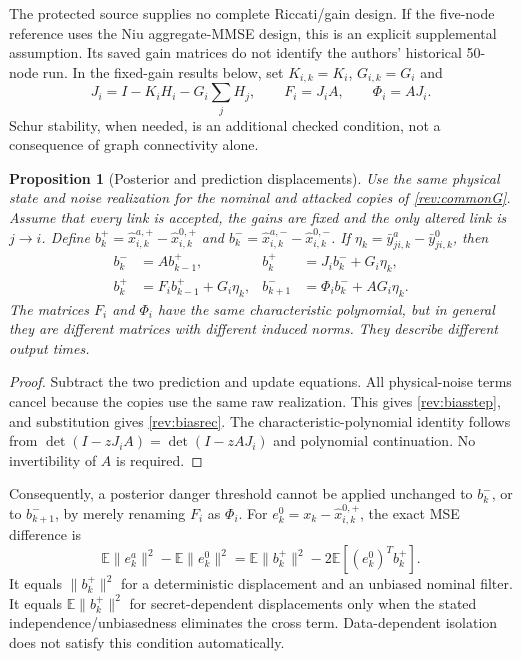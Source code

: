 \documentclass[11pt,a4paper]{article}
\newtheorem{proposition}{Proposition}
\newcommand{\E}{\mathbb E}
\begin{document}
The protected source supplies no complete Riccati/gain design.
If the five-node reference uses the Niu aggregate-MMSE design, this is an
explicit supplemental assumption. Its saved gain matrices do not identify
the authors' historical 50-node run. In the fixed-gain results below,
set $K_{i,k}=K_i$, $G_{i,k}=G_i$ and
\begin{equation}
 J_i=I-K_iH_i-G_i\sum_jH_j,\qquad
 F_i=J_iA,\qquad \Phi_i=AJ_i.\label{rev:Fphi}
\end{equation}
Schur stability, when needed, is an additional checked condition, not a
consequence of graph connectivity alone.

\begin{proposition}[Posterior and prediction displacements]
\label{rev:bias}
Use the same physical state and noise realization for the nominal and
attacked copies of \eqref{rev:commonG}. Assume that every link is accepted,
the gains are fixed and the only altered link is $j\to i$.
Define $b_k^+=\widehat x_{i,k}^{a,+}-\widehat x_{i,k}^{0,+}$ and
$b_k^-=\widehat x_{i,k}^{a,-}-\widehat x_{i,k}^{0,-}$.
If $\eta_k=\bar y_{ji,k}^{a}-\bar y_{ji,k}^{0}$, then
\begin{align}
 b_k^-&=A b_{k-1}^+, &
 b_k^+&=J_i b_k^-+G_i\eta_k,\label{rev:biasstep}\\
 b_k^+&=F_i b_{k-1}^++G_i\eta_k,&
 b_{k+1}^-&=\Phi_i b_k^-+AG_i\eta_k.\label{rev:biasrec}
\end{align}
The matrices $F_i$ and $\Phi_i$ have the same characteristic polynomial,
but in general they are different matrices with different induced norms.
They describe different output times.
\end{proposition}
\begin{proof}
Subtract the two prediction and update equations. All physical-noise terms
cancel because the copies use the same raw realization. This gives
\eqref{rev:biasstep}, and substitution gives \eqref{rev:biasrec}.
The characteristic-polynomial identity follows from
$\det(I-zJ_iA)=\det(I-zAJ_i)$ and polynomial continuation.
No invertibility of $A$ is required.
\end{proof}

Consequently, a posterior danger threshold cannot be applied unchanged
to $b_k^-$, or to $b_{k+1}^-$, by merely renaming $F_i$ as $\Phi_i$.
For $e_k^0=x_k-\widehat x_{i,k}^{0,+}$, the exact MSE difference is
\begin{equation}
 \E\|e_k^a\|^2-\E\|e_k^0\|^2
 =\E\|b_k^+\|^2-2\E[(e_k^0)^Tb_k^+].\label{rev:MSE}
\end{equation}
It equals $\|b_k^+\|^2$ for a deterministic displacement and an unbiased
nominal filter. It equals $\E\|b_k^+\|^2$ for secret-dependent
displacements only when the stated independence/unbiasedness eliminates
the cross term. Data-dependent isolation does not satisfy this condition
automatically.
\end{document}
